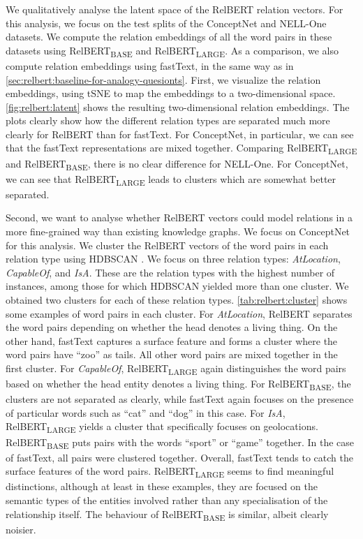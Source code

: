 \documentclass[3p]{elsarticle}
\begin{document}
{We qualitatively analyse the latent space of the RelBERT relation vectors. For this analysis, we focus on the test splits of the ConceptNet and NELL-One datasets. We compute the relation embeddings of all the word pairs in these datasets using RelBERT\textsubscript{BASE} and RelBERT\textsubscript{LARGE}. As a comparison, we also compute relation embeddings using fastText, in the same way as in \autoref{sec:relbert:baseline-for-analogy-quesionts}. First, we visualize the relation embeddings, using tSNE \cite{TSNE} to map the embeddings to a two-dimensional space. \autoref{fig:relbert:latent} shows the resulting two-dimensional relation embeddings. The plots clearly show how the different relation types are separated much more clearly for RelBERT than for fastText. For ConceptNet, in particular, we can see that the fastText representations are mixed together. Comparing RelBERT\textsubscript{LARGE} and RelBERT\textsubscript{BASE}, there is no clear difference for NELL-One. For ConceptNet, we can see that RelBERT\textsubscript{LARGE} leads to clusters which are somewhat better separated.

Second, we want to analyse whether RelBERT vectors could model relations in a more fine-grained way than existing knowledge graphs. We focus on ConceptNet for this analysis. We cluster the RelBERT vectors of the word pairs in each relation type using HDBSCAN \cite{HDBSCAN}. We focus on three relation types: \emph{AtLocation}, \emph{CapableOf}, and \emph{IsA}. These are the relation types with the highest number of instances, among those for which HDBSCAN yielded more than one cluster. We obtained two clusters for each of these relation types. \autoref{tab:relbert:cluster} shows some examples of word pairs in each cluster. For \emph{AtLocation}, RelBERT separates the word pairs depending on whether the head denotes a living thing. On the other hand, fastText captures a surface feature and forms a cluster where the word pairs have ``zoo'' as tails. All other word pairs are mixed together in the first cluster. For \emph{CapableOf}, RelBERT\textsubscript{LARGE} again distinguishes the word pairs based on whether the head entity denotes a living thing. For RelBERT\textsubscript{BASE}, the clusters are not separated as clearly, while fastText again focuses on the presence of particular words such as ``cat'' and ``dog'' in this case. For \emph{IsA}, RelBERT\textsubscript{LARGE} yields a cluster that specifically focuses on geolocations. RelBERT\textsubscript{BASE} puts pairs with the words ``sport'' or ``game'' together. In the case of fastText, all pairs were clustered together. Overall, fastText tends to catch the surface features of the word pairs. RelBERT\textsubscript{LARGE} seems to find meaningful distinctions, although at least in these examples, they are focused on the semantic types of the entities involved rather than any specialisation of the relationship itself. The behaviour of RelBERT\textsubscript{BASE} is similar, albeit clearly noisier.


}
\end{document}
